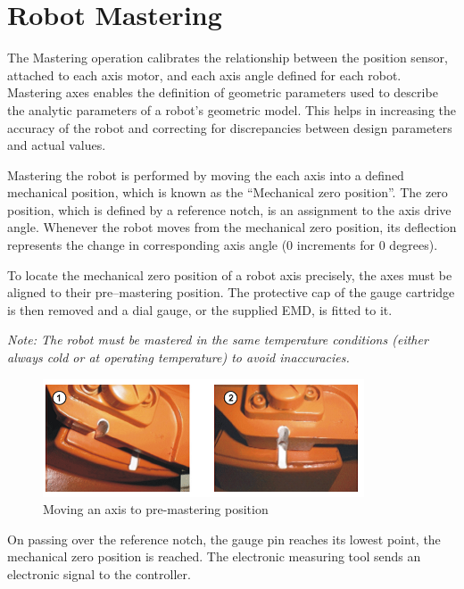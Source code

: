 \section{Robot Mastering}
The Mastering operation calibrates the relationship between the position sensor, attached to each axis motor, and each axis angle defined for each robot. Mastering axes enables the definition of geometric parameters used to describe the analytic parameters of a robot’s geometric model. This helps in increasing the accuracy of the robot and correcting for discrepancies between design parameters and actual values.

Mastering the robot is performed by moving the each axis into a defined mechanical position, which is known as the “Mechanical zero position”. The zero position, which is defined by a reference notch, is an assignment to the axis drive angle. Whenever the robot moves from the mechanical zero position, its deflection represents the change in corresponding axis angle (0 increments for 0 degrees).

To locate the mechanical zero position of a robot axis precisely, the axes must be aligned to their pre–mastering position. The protective cap of the gauge cartridge is then removed and a dial gauge, or the supplied EMD, is fitted to it. 

\textit{Note: The robot must be mastered in the same temperature conditions (either always cold or at operating temperature) to avoid inaccuracies.}
\begin{figure}
\centering
\includegraphics[width=0.7\linewidth]{figures/mastering1}
\caption{Moving an axis to pre-mastering position}
\label{fig:mastering1}
\end{figure}

On passing over the reference notch, the gauge pin reaches its lowest point, the mechanical zero position is reached. The electronic measuring tool sends an electronic signal to the controller.

